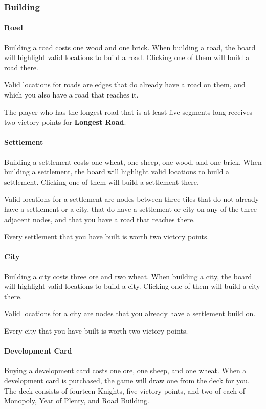 \documentclass[12pt,letterpaper,titlepage]{article}
\begin{document}
		\subsubsection{Building}
			\paragraph{Road}
			Building a road costs one wood and one brick. When building a road, the board will highlight valid locations to build a road. Clicking one of them will build a road there.
			
			Valid locations for roads are edges that do already have a road on them, and which you also have a road that reaches it.
			
			The player who has the longest road that is at least five segments long receives two victory points for \textbf{Longest Road}.

			\paragraph{Settlement}
			Building a settlement costs one wheat, one sheep, one wood, and one brick. When building a settlement, the board will highlight valid locations to build a settlement. Clicking one of them will build a settlement there.
			
			Valid locations for a settlement are nodes between three tiles that do not already have a settlement or a city, that do have a settlement or city on any of the three adjacent nodes, and that you have a road that reaches there.

			Every settlement that you have built is worth two victory points.
			
			\paragraph{City}
			Building a city costs three ore and two wheat. When building a city, the board will highlight valid locations to build a city. Clicking one of them will build a city there.
			
			Valid locations for a city are nodes that you already have a settlement build on.
			
			Every city that you have built is worth two victory points.
			
			\paragraph{Development Card}
			Buying a development card costs one ore, one sheep, and one wheat. When a development card is purchased, the game will draw one from the deck for you. The deck consists of fourteen Knights, five victory points, and two of each of Monopoly, Year of Plenty, and Road Building.
\end{document}
